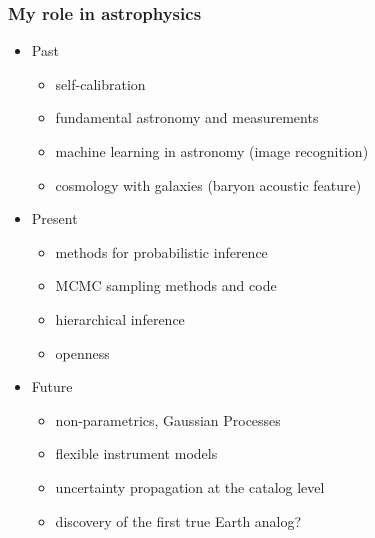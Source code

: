 \documentclass[aspectratio=169]{beamer}
\begin{document}
\begin{frame}
  \frametitle{My role in astrophysics}
  \begin{itemize}
  \item Past
    \begin{itemize}
    \item self-calibration
    \item fundamental astronomy and measurements
    \item machine learning in astronomy (image recognition)
    \item cosmology with galaxies (baryon acoustic feature)
    \end{itemize}
  \item Present
    \begin{itemize}
    \item methods for probabilistic inference
    \item MCMC sampling methods and code
    \item hierarchical inference
    \item openness
    \end{itemize}
  \item Future
    \begin{itemize}
    \item non-parametrics, Gaussian Processes
    \item flexible instrument models
    \item uncertainty propagation at the catalog level
    \item discovery of the first true Earth analog?
    \end{itemize}
  \end{itemize}
\end{frame}
\end{document}
